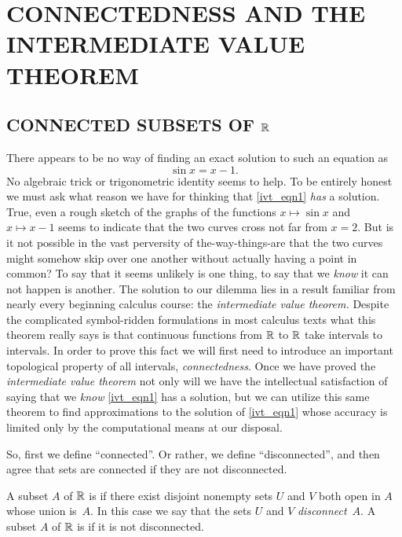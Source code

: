 \chapter{CONNECTEDNESS AND THE INTERMEDIATE VALUE THEOREM}\label{ivt}

\section{CONNECTED SUBSETS OF $\mathbb{R}$}
There appears to be no way of finding an exact solution to such an equation as
\begin{equation}\label{ivt_eqn1}  \sin x = x - 1.
\end{equation}
No algebraic trick or trigonometric identity seems to help.  To be entirely honest we must ask
what reason we have for thinking that \eqref{ivt_eqn1} \emph{has} a solution.  True, even a
rough sketch of the graphs of the functions $x \mapsto \sin x$ and $x \mapsto x - 1$ seems to
indicate that the two curves cross not far from $x = 2$. But is it not possible in the vast
perversity of the-way-things-are that the two curves might somehow skip over one another
without actually having a point in common?  To say that it seems unlikely is one thing, to say
that we \emph{know} it can not happen is another.  The solution to our dilemma lies in a
result familiar from nearly every beginning calculus course: the \emph{intermediate value
theorem.} Despite the complicated symbol-ridden formulations in most calculus texts what this
theorem really says is that continuous functions from $\mathbb{R}$ to $\mathbb{R}$ take intervals to
intervals.  In order to prove this fact we will first need to introduce an important
topological property of all intervals, \emph{connectedness}.  Once we have proved the
\emph{intermediate value theorem} not only will we have the intellectual satisfaction of
saying that we \emph{know} \eqref{ivt_eqn1} has a solution, but we can utilize this same
theorem to find approximations to the solution of \eqref{ivt_eqn1} whose accuracy is limited
only by the computational means at our disposal.

So, first we define ``connected''.  Or rather, we define ``disconnected'', and then agree that
sets are connected if they are not disconnected.

\begin{defn} A subset $A$ of $\mathbb{R}$ is
 if there exist disjoint nonempty sets $U$ and $V$ both open in $A$ whose
union is~$A$.  In this case we say that the sets $U$ and $V$ \emph{disconnect}~$A$.  A subset
$A$ of $\mathbb{R}$ is
 if it is not disconnected.
\end{defn}

